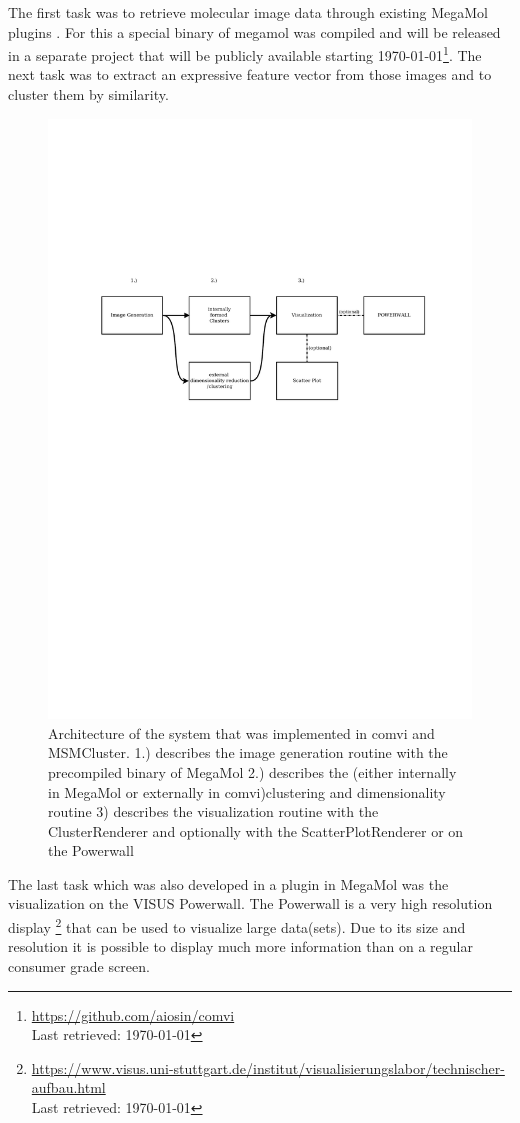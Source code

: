 \documentclass[journal]{vgtc}       %
\begin{document}
The first task was to retrieve molecular image data through existing MegaMol plugins \cite{molecularmaps}. For this a special binary of megamol was compiled and will be released in a separate project that will be publicly available starting \today \footnote{\url{https://github.com/aiosin/comvi}\\ Last retrieved: \today}.
The next task was to extract an expressive feature vector from those images and to cluster them by similarity.
\begin{figure}[htbp]
	\begin{center}
		\includegraphics[page=1,scale = .1,viewport= 150 650 700 900 ,width=.75\linewidth]{arch}

	\end{center}
	\caption{\label{fig:arch} Architecture of the system that was implemented in comvi and MSMCluster. 1.) describes the image generation routine with the precompiled binary of MegaMol 2.) describes the (either internally in MegaMol or externally in comvi)clustering and dimensionality routine 3) describes the visualization routine with the ClusterRenderer and optionally with the ScatterPlotRenderer or on the Powerwall }
\end{figure} 
The last task which was also developed in a plugin in MegaMol was the visualization on the VISUS Powerwall. The Powerwall is a very high resolution display \footnote{\url{https://www.visus.uni-stuttgart.de/institut/visualisierungslabor/technischer-aufbau.html} \\ Last retrieved: \today } that can be used to visualize large data(sets). Due to its size and resolution it is possible to display much more information than on a regular consumer grade screen. 
\end{document}
